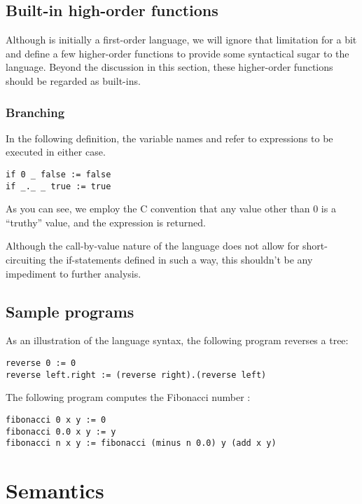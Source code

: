 \subsection{Built-in high-order
functions}\label{section:language-higher-order-built-ins}

Although  is initially a first-order language, we will ignore that
limitation for a bit and define a few higher-order functions to provide some
syntactical sugar to the language. Beyond the discussion in this section, these
higher-order functions should be regarded as  built-ins.

\subsubsection{Branching}

In the following definition, the variable names  and 
refer to expressions to be executed in either case.

\begin{verbatim}
if 0 _ false := false
if _._ _ true := true
\end{verbatim}

As you can see, we employ the C convention that any value other than $0$ is a
``truthy'' value, and the expression  is returned.

Although the call-by-value nature of the language does not allow for
short-circuiting the if-statements defined in such a way, this shouldn't be any
impediment to further analysis.

\subsection{Sample programs}

As an illustration of the language syntax, the following program reverses a tree:

\begin{verbatim}
reverse 0 := 0
reverse left.right := (reverse right).(reverse left)
\end{verbatim}

The following program computes the Fibonacci number :

\begin{verbatim}
fibonacci 0 x y := 0
fibonacci 0.0 x y := y
fibonacci n x y := fibonacci (minus n 0.0) y (add x y)
\end{verbatim}

\section{Semantics}

